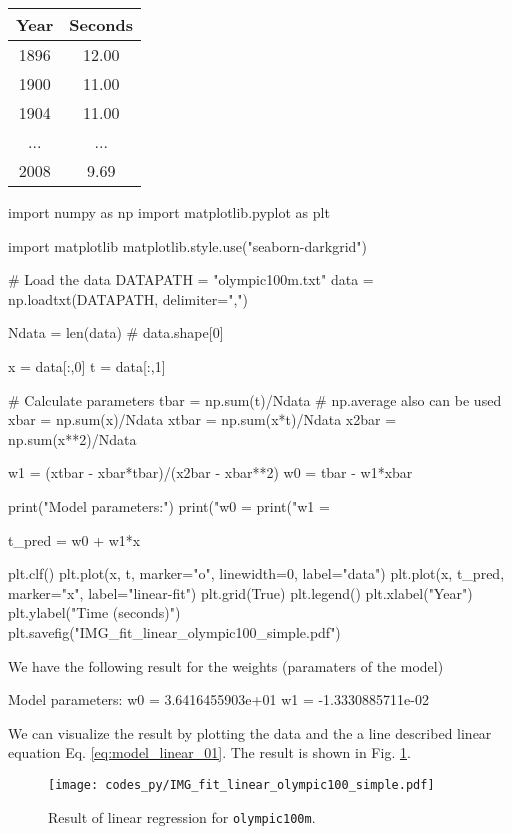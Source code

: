 \documentclass[b5paper,12pt]{article} %
\newcommand{\txtinline}[1]{\texttt{#1}}
\begin{document}
\begin{table}[H]
\begin{center}
\begin{tabular}{|c|c|}
\hline
Year & Seconds \\
\hline
1896 & 12.00 \\
1900 & 11.00 \\
1904 & 11.00 \\
...  & ...   \\
2008 & 9.69  \\
\hline
\end{tabular}
\end{center}
\end{table}


\begin{pythoncode}
import numpy as np
import matplotlib.pyplot as plt
  
import matplotlib
matplotlib.style.use("seaborn-darkgrid")
  
# Load the data
DATAPATH = "olympic100m.txt"
data = np.loadtxt(DATAPATH, delimiter=",")
  
Ndata = len(data) # data.shape[0]
  
x = data[:,0]
t = data[:,1]
  
# Calculate parameters
tbar = np.sum(t)/Ndata # np.average also can be used
xbar = np.sum(x)/Ndata
xtbar = np.sum(x*t)/Ndata
x2bar = np.sum(x**2)/Ndata
  
w1 = (xtbar - xbar*tbar)/(x2bar - xbar**2)
w0 = tbar - w1*xbar
  
print("Model parameters:")
print("w0 = %
print("w1 = %
  
t_pred = w0 + w1*x
  
plt.clf()
plt.plot(x, t, marker="o", linewidth=0, label="data")
plt.plot(x, t_pred, marker="x", label="linear-fit")
plt.grid(True)
plt.legend()
plt.xlabel("Year")
plt.ylabel("Time (seconds)")
plt.savefig("IMG_fit_linear_olympic100_simple.pdf")  
\end{pythoncode}

We have the following result for the weights (paramaters of the model)
\begin{textcode}
Model parameters:
w0 =   3.6416455903e+01
w1 =  -1.3330885711e-02
\end{textcode}

We can visualize the result by plotting the data and the a line described
linear equation Eq. \eqref{eq:model_linear_01}. The result is shown in
Fig. \ref{fig:linreg_01}.
\begin{figure}[H]
\begin{center}
\texttt{[image: codes\_py/IMG\_fit\_linear\_olympic100\_simple.pdf]}
\end{center}
\caption{Result of linear regression for \txtinline{olympic100m}.}
\label{fig:linreg_01}
\end{figure}
\end{document}
